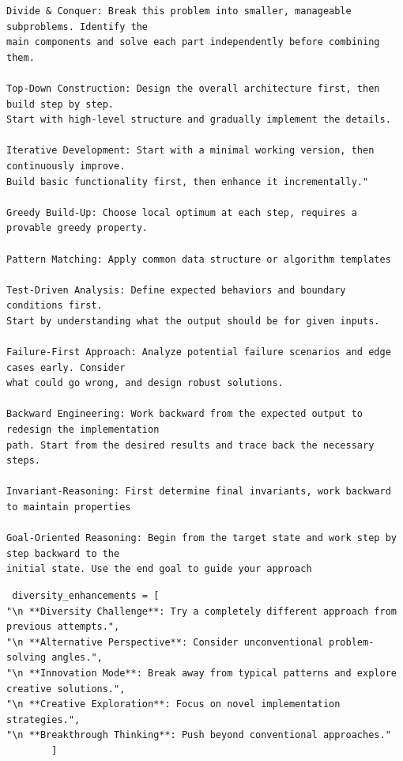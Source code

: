 \documentclass[11pt]{article}
\theoremstyle{definition}
\theoremstyle{remark}
\begin{document}
\begin{tcolorbox}[notitle, sharp corners, breakable, colframe=Periwinkle, colback=white, 
       boxrule=3pt, boxsep=0.5pt, enhanced, 
       shadow={3pt}{-3pt}{0pt}{opacity=1,mygrey},
       title={Different Thinking Strategy(Mode)},]\label{box:different-thinking-strategy}
       \scriptsize
       
\begin{lstlisting}
Divide & Conquer: Break this problem into smaller, manageable subproblems. Identify the 
main components and solve each part independently before combining them.

Top-Down Construction: Design the overall architecture first, then build step by step. 
Start with high-level structure and gradually implement the details.

Iterative Development: Start with a minimal working version, then continuously improve. 
Build basic functionality first, then enhance it incrementally."

Greedy Build-Up: Choose local optimum at each step, requires a provable greedy property.

Pattern Matching: Apply common data structure or algorithm templates

Test-Driven Analysis: Define expected behaviors and boundary conditions first. 
Start by understanding what the output should be for given inputs.

Failure-First Approach: Analyze potential failure scenarios and edge cases early. Consider 
what could go wrong, and design robust solutions.

Backward Engineering: Work backward from the expected output to redesign the implementation 
path. Start from the desired results and trace back the necessary steps.
                       
Invariant-Reasoning: First determine final invariants, work backward to maintain properties

Goal-Oriented Reasoning: Begin from the target state and work step by step backward to the 
initial state. Use the end goal to guide your approach
\end{lstlisting}
\end{tcolorbox}




\begin{tcolorbox}[notitle, sharp corners, breakable, colframe=black, colback=white, 
       boxrule=3pt, boxsep=0.5pt, enhanced, 
       shadow={3pt}{-3pt}{0pt}{opacity=1,mygrey},
       title={Diversity-enhancing Tips},]\label{box:diversity-enhancing-tips}
       \scriptsize
       
\begin{lstlisting}
 diversity_enhancements = [
"\n **Diversity Challenge**: Try a completely different approach from previous attempts.",
"\n **Alternative Perspective**: Consider unconventional problem-solving angles.",
"\n **Innovation Mode**: Break away from typical patterns and explore creative solutions.",
"\n **Creative Exploration**: Focus on novel implementation strategies.",
"\n **Breakthrough Thinking**: Push beyond conventional approaches."
        ]
\end{lstlisting}
\end{tcolorbox}
\end{document}
